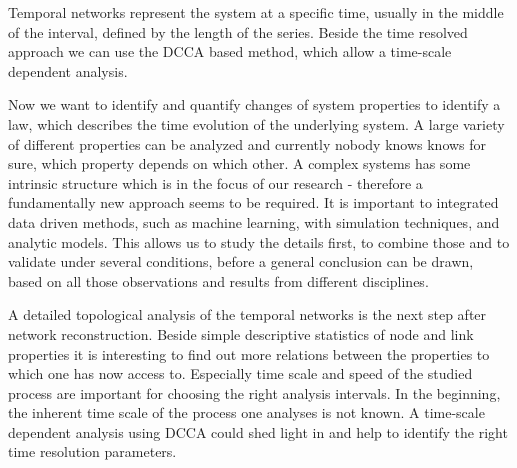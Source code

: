 \documentclass[a4paper,10pt]{scrbook}
\begin{document}
\cite{Berberich04}

\cite{Hou2012}


Temporal networks represent the system at a specific time, usually in the middle of the interval, defined by the length of the series. Beside the time resolved approach we can use the DCCA based method, which allow a time-scale dependent analysis.

Now we want to identify and quantify changes of system properties to identify a law, which describes the time evolution of the underlying system. A large variety of  different properties can be analyzed and currently nobody knows knows for sure, which property depends on which other. A complex systems has some intrinsic structure which is in the focus of our research - therefore a fundamentally new approach seems to be required. It is important to integrated data driven methods, such as machine learning, with simulation techniques, and analytic models. This allows us to study the details first, to combine those and to validate under several conditions, before a general conclusion can be drawn, based on all those observations and results from different disciplines. 


A detailed topological analysis of the temporal networks is the next step after network reconstruction. Beside simple descriptive statistics of node and link properties it is interesting to find out more relations between the properties to which one has now access to. Especially time scale and speed of the studied process are important for choosing the right analysis intervals. In the beginning, the inherent time scale of the process one analyses is not known. A time-scale dependent analysis using DCCA could shed light in and help to identify the right time resolution parameters. 
\end{document}
